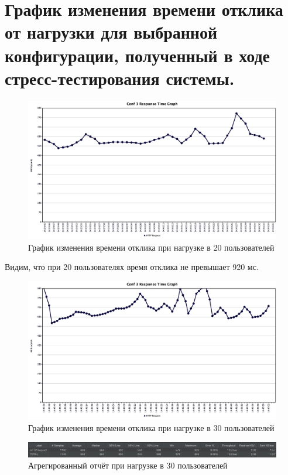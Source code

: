 \documentclass[12pt,onecolumn]{article}
\begin{document}
\section*{График изменения времени отклика от нагрузки для выбранной конфигурации, полученный в ходе стресс-тестирования системы.}
\begin{figure}[H]
  \includegraphics[width=\textwidth]{image/resp-graph-conf-3-2.png}
  \caption{График изменения времени отклика при нагрузке в 20 пользователей}
\end{figure}

Видим, что при 20 пользователях время отклика не превышает 920 мс.

\begin{figure}[H]
  \includegraphics[width=\textwidth]{image/resp-graph-conf-3-3.png}
  \caption{График изменения времени отклика при нагрузке в 30 пользователей}
\end{figure}

\begin{figure}[H]
  \includegraphics[width=\textwidth]{image/aggregate-report-conf3-3.png}
  \caption{Агрегированный отчёт при нагрузке в 30 пользователей}
\end{figure}
\end{document}

